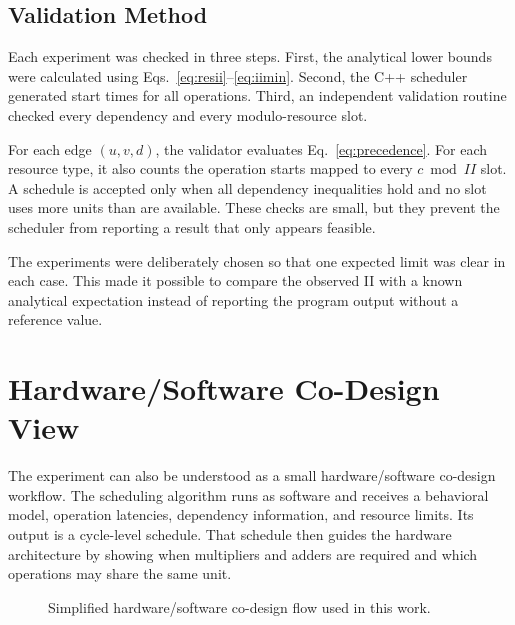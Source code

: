 \documentclass[conference]{IEEEtran}
\begin{document}
\subsection{Validation Method}

Each experiment was checked in three steps. First, the analytical lower bounds
were calculated using Eqs.~\eqref{eq:resii}--\eqref{eq:iimin}. Second, the C++
scheduler generated start times for all operations. Third, an independent
validation routine checked every dependency and every modulo-resource slot.

For each edge $(u,v,d)$, the validator evaluates Eq.~\eqref{eq:precedence}. For
each resource type, it also counts the operation starts mapped to every
$c\bmod II$ slot. A schedule is accepted only when all dependency inequalities
hold and no slot uses more units than are available. These checks are small, but
they prevent the scheduler from reporting a result that only appears feasible.

The experiments were deliberately chosen so that one expected limit was clear in
each case. This made it possible to compare the observed II with a known
analytical expectation instead of reporting the program output without a
reference value.

\section{Hardware/Software Co-Design View}

The experiment can also be understood as a small hardware/software co-design
workflow. The scheduling algorithm runs as software and receives a behavioral
model, operation latencies, dependency information, and resource limits. Its
output is a cycle-level schedule. That schedule then guides the hardware
architecture by showing when multipliers and adders are required and which
operations may share the same unit.

\begin{figure}[t]
\centering
{}
\caption{Simplified hardware/software co-design flow used in this work.}
\label{fig:codesign}
\end{figure}
\end{document}
